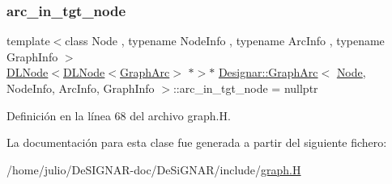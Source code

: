 \subsubsection{\texorpdfstring{arc\+\_\+in\+\_\+tgt\+\_\+node}{arc\_in\_tgt\_node}}
{\footnotesize\ttfamily template$<$class Node , typename Node\+Info , typename Arc\+Info , typename Graph\+Info $>$ \\
\hyperlink{class_designar_1_1_d_l_node}{D\+L\+Node}$<$\hyperlink{class_designar_1_1_d_l_node}{D\+L\+Node}$<$\hyperlink{class_designar_1_1_graph_arc}{Graph\+Arc}$>$ $\ast$$>$$\ast$ \hyperlink{class_designar_1_1_graph_arc}{Designar\+::\+Graph\+Arc}$<$ \hyperlink{namespace_designar_a5af326c65aa2bd26b26c410f2030d09e}{Node}, Node\+Info, Arc\+Info, Graph\+Info $>$\+::arc\+\_\+in\+\_\+tgt\+\_\+node = nullptr\hspace{0.3cm}{\ttfamily [protected]}}



Definición en la línea 68 del archivo graph.\+H.



La documentación para esta clase fue generada a partir del siguiente fichero\+:\begin{DoxyCompactItemize}
\item 
/home/julio/\+De\+S\+I\+G\+N\+A\+R-\/doc/\+De\+Si\+G\+N\+A\+R/include/\hyperlink{graph_8_h}{graph.\+H}\end{DoxyCompactItemize}
